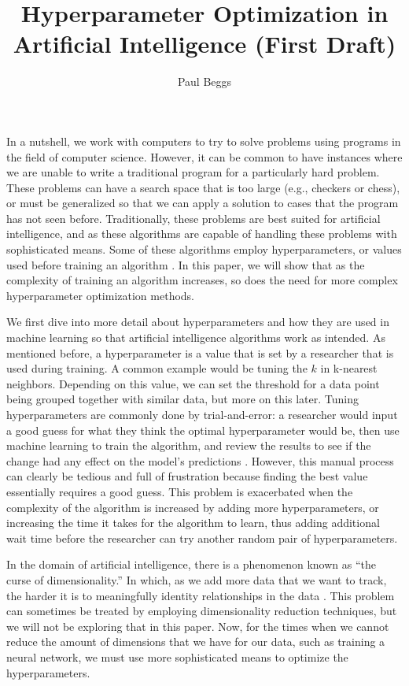 \documentclass[stu,12pt,floatsintext]{apa7}
\title{Hyperparameter Optimization in Artificial Intelligence (First Draft)}
\author{Paul Beggs}
\affiliation{Hendrix College}
\begin{document}
\maketitle

\renewcommand{\labelenumi}{\theenumi.}

In a nutshell, we work with computers to try to solve problems using programs in the field of computer science. However, it can be common to have instances where we are unable to write a traditional program for a particularly hard problem. These problems can have a search space that is too large (e.g., checkers or chess), or must be generalized so that we can apply a solution to cases that the program has not seen before. Traditionally, these problems are best suited for artificial intelligence, and as these algorithms are capable of handling these problems with sophisticated means. Some of these algorithms employ hyperparameters, or values used before training an algorithm \parencite{weerts2020importance}. In this paper, we will show that as the complexity of training an algorithm increases, so does the need for more complex hyperparameter optimization methods.

We first dive into more detail about hyperparameters and how they are used in machine learning so that artificial intelligence algorithms work as intended. As mentioned before, a hyperparameter is a value that is set by a researcher that is used during training. A common example would be tuning the \(k\) in k-nearest neighbors. Depending on this value, we can set the threshold for a data point being grouped together with similar data, but more on this later. Tuning hyperparameters are commonly done by trial-and-error: a researcher would input a good guess for what they think the optimal hyperparameter would be, then use machine learning to train the algorithm, and review the results to see if the change had any effect on the model's predictions \parencite{bergstra2012random}. However, this manual process can clearly be tedious and full of frustration because finding the best value essentially requires a good guess. This problem is exacerbated when the complexity of the algorithm is increased by adding more hyperparameters, or increasing the time it takes for the algorithm to learn, thus adding additional wait time before the researcher can try another random pair of hyperparameters.

In the domain of artificial intelligence, there is a phenomenon known as ``the curse of dimensionality.'' In which, as we add more data that we want to track, the harder it is to meaningfully identity relationships in the data \parencite{geeksforgeeks_2024_curse}. This problem can sometimes be treated by employing dimensionality reduction techniques, but we will not be exploring that in this paper. Now, for the times when we cannot reduce the amount of dimensions that we have for our data, such as training a neural network, we must use more sophisticated means to optimize the hyperparameters. 
\end{document}
